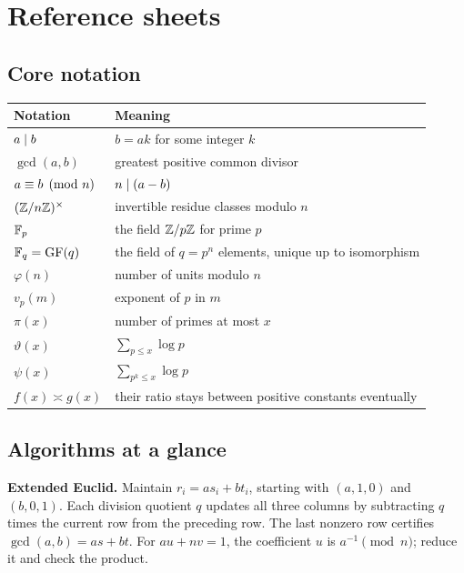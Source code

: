 \chapter{Reference sheets}

\section*{Core notation}

\begin{center}
\begin{tabularx}{\textwidth}{p{}X}
\toprule
Notation & Meaning \\
\midrule
$a\mid b$ & $b=ak$ for some integer $k$ \\
$\gcd(a,b)$ & greatest positive common divisor \\
$a\equiv b\pmod n$ & $n\mid(a-b)$ \\
$(\mathbb Z/n\mathbb Z)^\times$ & invertible residue classes modulo $n$ \\
$\mathbb F_p$ & the field $\mathbb Z/p\mathbb Z$ for prime $p$ \\
$\mathbb F_q=\operatorname{GF}(q)$ & the field of $q=p^n$ elements, unique up to isomorphism \\
$\varphi(n)$ & number of units modulo $n$ \\
$v_p(m)$ & exponent of $p$ in $m$ \\
$\pi(x)$ & number of primes at most $x$ \\
$\vartheta(x)$ & $\sum_{p\le x}\log p$ \\
$\psi(x)$ & $\sum_{p^k\le x}\log p$ \\
$f(x)\asymp g(x)$ & their ratio stays between positive constants eventually \\
\bottomrule
\end{tabularx}
\end{center}

\section*{Algorithms at a glance}

\textbf{Extended Euclid.} Maintain $r_i=as_i+bt_i$, starting with
$(a,1,0)$ and $(b,0,1)$. Each division quotient $q$ updates all three
columns by subtracting $q$ times the current row from the preceding row.
The last nonzero row certifies $\gcd(a,b)=as+bt$.
For $au+nv=1$, the coefficient $u$ is $a^{-1}\pmod n$;
reduce it and check the product.

